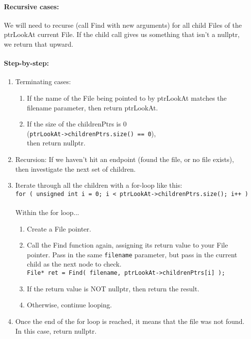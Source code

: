 \documentclass[a4paper,12pt,oneside]{book}
\begin{document}
\paragraph{Recursive cases:}

We will need to recurse (call Find with new arguments) for all child Files of the ptrLookAt current File. If the child call gives us something that isn't a nullptr, we return that upward.

\paragraph{Step-by-step:}

\begin{enumerate}
    \item   Terminating cases:
    \begin{enumerate}
        \item   If the name of the File being pointed to by ptrLookAt matches the filename parameter, then return ptrLookAt.
        \item   If the size of the childrenPtrs is 0 \\
        \small (\texttt{ptrLookAt->childrenPtrs.size() == 0}), \\
        \normalsize
        then return nullptr.
    \end{enumerate}

    \item   Recursion: If we haven't hit an endpoint (found the file, or no file exists), then investigate the next set of children.
    \item   Iterate through all the children with a for-loop like this: \\
        \footnotesize
        \texttt{for ( unsigned int i = 0; i < ptrLookAt->childrenPtrs.size(); i++ )} \\ \\
        \normalsize
        Within the for loop...
        \begin{enumerate}
            \item   Create a File pointer.
            \item   Call the Find function again, assigning its return value to your File pointer.
                    Pass in the same \texttt{filename} parameter, but pass in
                    the current child as the next node to check.
                \\
                \texttt{File* ret = Find( filename, ptrLookAt->childrenPtrs[i] );}
            \item   If the return value is NOT nullptr, then return the result.
            \item   Otherwise, continue looping.
        \end{enumerate}
    \item   Once the end of the for loop is reached, it means that the file was not found.
            In this case, return nullptr.
\end{enumerate}
\end{document}
